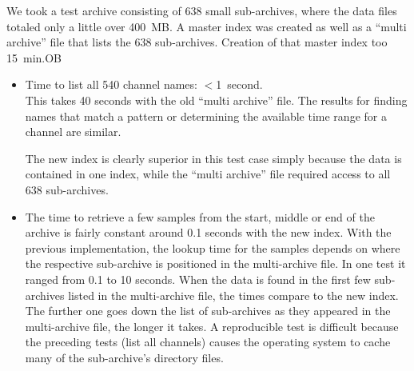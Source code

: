 We took a test archive consisting of 638 small sub-archives,
where the data files totaled only a little over 400~MB.
A master index was created as well as a ``multi archive'' file
that lists the 638 sub-archives.
Creation of that master index too 15~min.OB
\begin{itemize}
\item Time to list all  540 channel names: $<$1~second.\\
      This takes 40 seconds with the old ``multi archive'' file.
      The results for finding names that match a pattern or
      determining the available time range for a channel are
      similar.

      The new index is clearly superior in this test case simply
      because the data is contained in one index, while the ``multi
      archive'' file required access to all 638 sub-archives.
\item The time to retrieve a few samples from the start, middle or end of the
      archive is fairly constant around 0.1 seconds with the new
      index. With the previous implementation, the lookup time for
      the samples depends on where the respective sub-archive is
      positioned in the multi-archive file. In one test it ranged from
      0.1 to 10 seconds.  When the data is found in the first few
      sub-archives listed in the multi-archive file, the times compare
      to the new index. The further one goes down the list of
      sub-archives as they appeared in the multi-archive file, the
      longer it takes. A reproducible test is difficult because the
      preceding tests (list all channels) causes the operating system
      to cache many of the sub-archive's directory files.
\end{itemize}

